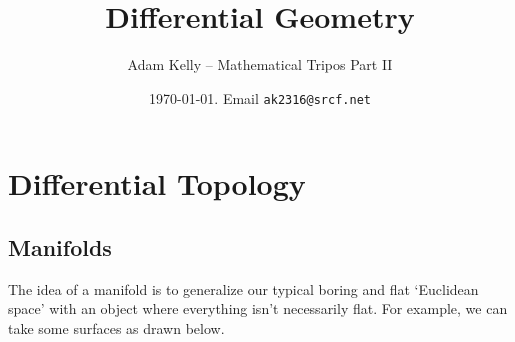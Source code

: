 \documentclass[a4paper, 10pt, twocolumn]{amsart}
\title{Differential Geometry}
\author{Adam Kelly -- Mathematical Tripos Part II}
\date{\today. Email \texttt{ak2316@srcf.net}}
\begin{document}
\maketitle



\section{Differential Topology}

\subsection{Manifolds}

The idea of a manifold is to generalize our typical boring and flat `Euclidean space' with an object where everything isn't necessarily flat. For example, we can take some surfaces as drawn below. 
\end{document}

